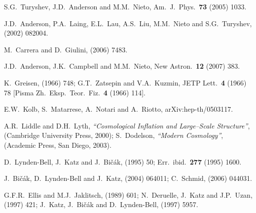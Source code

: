 \documentclass[12pt]{iopart}
\begin{document}
\begin{thebibliography}{66}
S.G.~Turyshev, J.D.~Anderson and M.M.~Nieto,
Am.\ J.\ Phys.\ {\bf73} (2005) 1033. %

J.D.~Anderson, P.A.~Laing, E.L.~Lau, A.S.~Liu, M.M.~Nieto and S.G.~Turyshev,
 (2002) 082004. %

M.~Carrera and D.~Giulini,
 (2006) 7483. %

J.D.~Anderson, J.K.~Campbell and M.M.~Nieto,
New Astron.\ {\bf12} (2007) 383. %

K.~Greisen,
 (1966) 748;
G.T.~Zatsepin and V.A.~Kuzmin,
JETP Lett.\ {\bf4} (1966) 78
[Pisma Zh.\ Eksp.\ Teor.\ Fiz.\ {\bf 4} (1966) 114].

E.W.~Kolb, S.~Matarrese, A.~Notari and A.~Riotto,
arXiv:hep-th/0503117.

A.R.~Liddle and D.H.~Lyth,
{\em``Cosmological Inflation and Large--Scale Structure''},
(Cambridge University Press, 2000);
S.~Dodelson,
{\em``Modern Cosmology''},
(Academic Press, San Diego, 2003).

D.~Lynden-Bell, J.~Katz and J.~Bi\v{c}\'ak,
 (1995) 50; Err.\ ibid.\ {\bf277} (1995) 1600.

J.~Bi\v{c}\'ak, D.~Lynden-Bell and J.~Katz,
 (2004) 064011; %
C.~Schmid,
 (2006) 044031. %

G.F.R.~Ellis and M.J.~Jaklitsch,
 (1989) 601;
N.~Deruelle, J.~Katz and J.P.~Uzan,
 (1997) 421; %
J.~Katz, J.~Bi\v{c}\'ak and D.~Lynden-Bell,
 (1997) 5957. %


\end{thebibliography}
\end{document}
